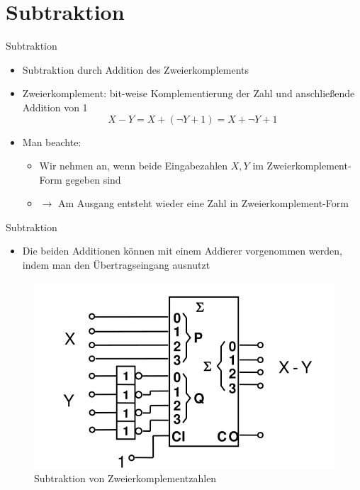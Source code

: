 \documentclass[12pt%
,xcolor=table
,aspectratio=169%
]{beamer}
\begin{document}
\section{Subtraktion}
\begin{frame}{Subtraktion}
\begin{itemize}
	\item Subtraktion durch Addition des Zweierkomplements
	\item Zweierkomplement: bit-weise Komplementierung der Zahl und anschließende Addition von 1
	$$
		X - Y = X + (\neg Y + 1) = X + \neg Y + 1
	$$
	\item Man beachte:
	\begin{itemize}
		\item Wir nehmen an, wenn beide Eingabezahlen $X,Y$ im Zweierkomplement-Form gegeben sind
		\item $\to$ Am Ausgang entsteht wieder eine Zahl in Zweierkomplement-Form
	\end{itemize}
\end{itemize}
\end{frame}

\begin{frame}{Subtraktion}
\begin{itemize}
	\item Die beiden Additionen können mit einem Addierer vorgenommen werden, indem man den Übertragseingang ausnutzt
\end{itemize}
\begin{figure}
\center
\includegraphics[scale=0.4]{pictures/sub_complement}
\caption{Subtraktion von Zweierkomplementzahlen}
\end{figure}
\end{frame}
\end{document}
